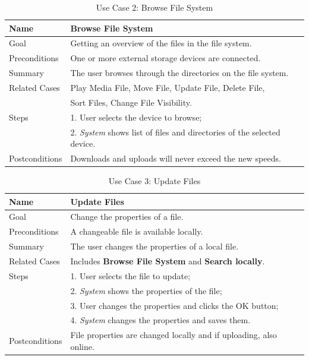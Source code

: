 \begin{table}[h!]
\centering
\begin{tabular}{|l|l|}
\hline
Name & Browse File System\\ \hline
Goal & Getting an overview of the files in the file system.\\ \hline
Preconditions & One or more external storage devices are connected. \\ \hline
Summary & The user browses through the directories on the file system.\\ \hline
Related Cases & Play Media File, Move File, Update File, Delete File, \\ 
              &  Sort Files, Change File Visibility. \\ \hline
Steps &  1. User selects the device to browse; \\
      &  2. \textit{System} shows list of files and directories of the selected device. 
        \\ \hline
Postconditions & Downloads and uploads will never exceed the new speeds.
\\ \hline
\end{tabular}
\caption{Use Case 2: Browse File System}
\label{tab:UC2}
\end{table}

\begin{table}[h!]
\centering
\begin{tabular}{|l|l|}
\hline
Name & Update Files\\ \hline
Goal & Change the properties of a file.\\ \hline
Preconditions & A changeable file is available locally. \\ \hline
Summary & The user changes the properties of a local file.\\ \hline
Related Cases & Includes \textbf{Browse File System} and \textbf{Search locally}. \\ \hline
Steps &  1. User selects the file to update; \\
      &  2. \textit{System} shows the properties of the file; \\ 
      &  3. User changes the properties and clicks the OK button; \\
      &  4. \textit{System} changes the properties and saves them. 
        \\ \hline
Postconditions & File properties are changed locally and if uploading, also online.
\\ \hline
\end{tabular}
\caption{Use Case 3: Update Files}
\label{tab:UC3}
\end{table}

